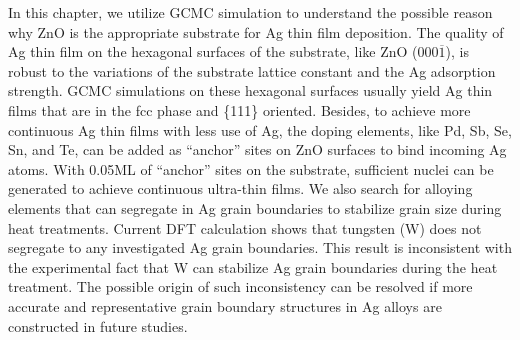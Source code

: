 

In this chapter, we utilize \acf{GCMC} simulation to understand the possible reason why ZnO is the appropriate substrate for Ag thin film deposition. The quality of Ag thin film on the hexagonal surfaces of the substrate, like ZnO (000$\overline{1}$), is robust to the variations of the substrate lattice constant and the Ag adsorption strength. \ac{GCMC} simulations on these hexagonal surfaces usually yield Ag thin films that are in the fcc phase and \{111\} oriented. Besides, to achieve more continuous Ag thin films with less use of Ag, the doping elements, like Pd, Sb, Se, Sn, and Te, can be added as ``anchor'' sites on ZnO surfaces to bind incoming Ag atoms. With 0.05\ac{ML} of ``anchor'' sites on the substrate, sufficient nuclei can be generated to achieve continuous ultra-thin films. We also search for alloying elements that can segregate in Ag grain boundaries to stabilize grain size during heat treatments. Current \ac{DFT} calculation shows that tungsten (W) does not segregate to any investigated Ag grain boundaries. This result is inconsistent with the experimental fact that W can stabilize Ag grain boundaries during the heat treatment. The possible origin of such inconsistency can be resolved if more accurate and representative grain boundary structures in Ag alloys are constructed in future studies.






